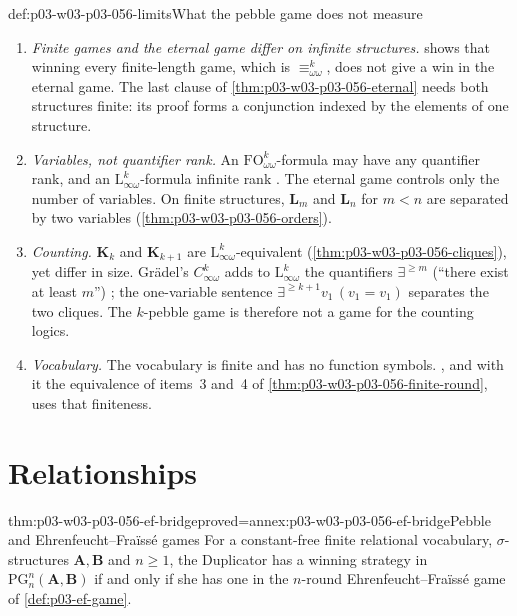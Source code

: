 \begin{hbwarning}{def:p03-w03-p03-056-limits}{What the pebble game does not measure}
\begin{enumerate}
\item \emph{Finite games and the eternal game differ on infinite
      structures.}  shows that winning
      every finite-length game, which is
      \(\equiv^k_{\omega\omega}\), does not give a win in the eternal game.
      The last clause of \cref{thm:p03-w03-p03-056-eternal} needs both
      structures finite: its proof forms a conjunction indexed by the
      elements of one structure.
\item \emph{Variables, not quantifier rank.} An
      \(\mathrm{FO}^k_{\omega\omega}\)-formula may have any quantifier
      rank, and an \(\mathrm{L}^k_{\infty\omega}\)-formula infinite rank
      \cite[p.~53]{Kolaitis2003ExpressivePowerNotes}. The eternal game
      controls only the number of variables. On finite structures,
      \(\mathbf L_m\) and \(\mathbf L_n\) for \(m<n\) are separated by two
      variables (\cref{thm:p03-w03-p03-056-orders}).
\item \emph{Counting.} \(\mathbf K_k\) and \(\mathbf K_{k+1}\) are
      \(\mathrm{L}^k_{\infty\omega}\)-equivalent
      (\cref{thm:p03-w03-p03-056-cliques}), yet differ in size. Gr\"adel's
      \(C^k_{\infty\omega}\) adds to \(\mathrm{L}^k_{\infty\omega}\) the
      quantifiers \(\exists^{\geq m}\) (``there exist at least \(m\)'')
      \cite[p.~190]{Gradel2007FMTDescriptiveChapter}; the one-variable
      sentence \(\exists^{\geq k+1}v_1\,(v_1=v_1)\) separates the two
      cliques. The \(k\)-pebble game is therefore not a game for the
      counting logics.
\item \emph{Vocabulary.} The vocabulary is finite and has no function
      symbols. , and with it the
      equivalence of items~3 and~4 of
      \cref{thm:p03-w03-p03-056-finite-round}, uses that finiteness.
\end{enumerate}
\end{hbwarning}

\section{Relationships}
\label{sec:p03-w03-p03-056-relations}

\begin{hblemma}{thm:p03-w03-p03-056-ef-bridge}{proved=annex:p03-w03-p03-056-ef-bridge}{Pebble and Ehrenfeucht--Fra\"iss\'e games}
For a constant-free finite relational vocabulary, \(\sigma\)-structures
\(\mathbf A,\mathbf B\) and \(n\geq1\), the Duplicator has a winning
strategy in \(\mathrm{PG}^n_n(\mathbf A,\mathbf B)\) if and only if she has
one in the \(n\)-round Ehrenfeucht--Fra\"iss\'e game of
\cref{def:p03-ef-game}.
\end{hblemma}


